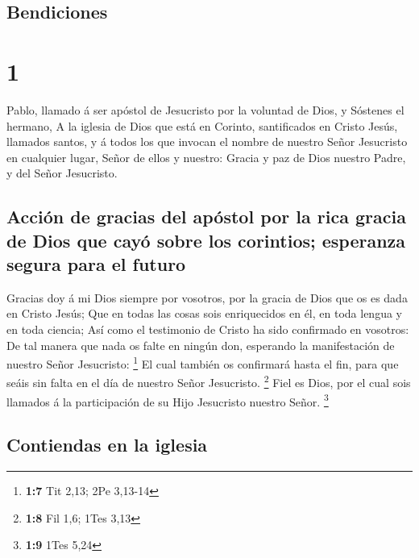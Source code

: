 \hypertarget{bendiciones}{%
\subsection{Bendiciones}\label{bendiciones}}

\hypertarget{section}{%
\section{1}\label{section}}

 Pablo, llamado á ser apóstol de Jesucristo por la
voluntad de Dios, y Sóstenes el hermano,  A la iglesia de
Dios que está en Corinto, santificados en Cristo Jesús, llamados santos,
y á todos los que invocan el nombre de nuestro Señor Jesucristo en
cualquier lugar, Señor de ellos y nuestro:  Gracia y paz
de Dios nuestro Padre, y del Señor Jesucristo.

\hypertarget{acciuxf3n-de-gracias-del-apuxf3stol-por-la-rica-gracia-de-dios-que-cayuxf3-sobre-los-corintios-esperanza-segura-para-el-futuro}{%
\subsection{Acción de gracias del apóstol por la rica gracia de Dios que
cayó sobre los corintios; esperanza segura para el
futuro}\label{acciuxf3n-de-gracias-del-apuxf3stol-por-la-rica-gracia-de-dios-que-cayuxf3-sobre-los-corintios-esperanza-segura-para-el-futuro}}

 Gracias doy á mi Dios siempre por vosotros, por la gracia
de Dios que os es dada en Cristo Jesús;  Que en todas las
cosas sois enriquecidos en él, en toda lengua y en toda ciencia;
 Así como el testimonio de Cristo ha sido confirmado en
vosotros:  De tal manera que nada os falte en ningún don,
esperando la manifestación de nuestro Señor Jesucristo: \footnote{\textbf{1:7}
  Tit 2,13; 2Pe 3,13-14}  El cual también os confirmará
hasta el fin, para que seáis sin falta en el día de nuestro Señor
Jesucristo. \footnote{\textbf{1:8} Fil 1,6; 1Tes 3,13} 
Fiel es Dios, por el cual sois llamados á la participación de su Hijo
Jesucristo nuestro Señor. \footnote{\textbf{1:9} 1Tes 5,24}

\hypertarget{contiendas-en-la-iglesia}{%
\subsection{Contiendas en la iglesia}\label{contiendas-en-la-iglesia}}

